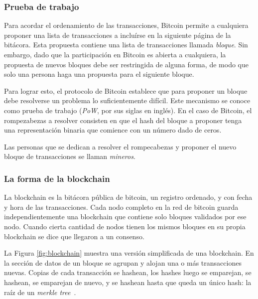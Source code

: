  \subsubsection{Prueba de trabajo}

 Para acordar el ordenamiento de las transacciones, Bitcoin permite a cualquiera proponer una lista
 de transacciones a incluírse en la siguiente página de la bitácora.
 Esta propuesta contiene una lista de transacciones llamada \textit{bloque}.
 Sin embargo, dado que la participación en Bitcoin es abierta a cualquiera, la propuesta de nuevos
 bloques debe ser restringida de alguna forma, de modo que solo una persona haga una propuesta
 para el siguiente bloque.

Para lograr esto, el protocolo de Bitcoin establece que para proponer un bloque debe resolverse
un problema lo suficientemente difícil.
%
Este mecanismo se conoce como prueba de trabajo (\textit{PoW}, por sus siglas en inglés).
%
En el caso de Bitcoin, el rompezabezas a resolver consisten en que el hash del bloque a proponer
tenga una representación binaria que comience con un número dado de ceros.

%
Las personas que se dedican a resolver el rompecabezas y proponer el nuevo bloque de transacciones
se llaman \textit{mineros}.

\subsubsection{La forma de la blockchain}

La blockchain es la bitácora pública de bitcoin, un registro ordenado, y con fecha y hora de las transacciones.
%
Cada nodo completo en la red de bitcoin guarda independientemente una blockchain que contiene solo
bloques validados por ese nodo.
%
Cuando cierta cantidad de nodos tienen los mismos bloques en su propia blockchain
se dice que llegaron a un consenso. 

La Figura \ref{fig:blockchain} muestra una versión simplificada de una blockchain.
En la sección de datos de un bloque
se agrupan y alojan una o más transacciones nuevas. Copias de cada transacción se hashean, los hashes luego
se emparejan, se hashean, se emparejan de nuevo, y se hashean hasta que queda un único hash: la raíz de un
\textit{merkle tree}~\cite{merkle.tree}. 

